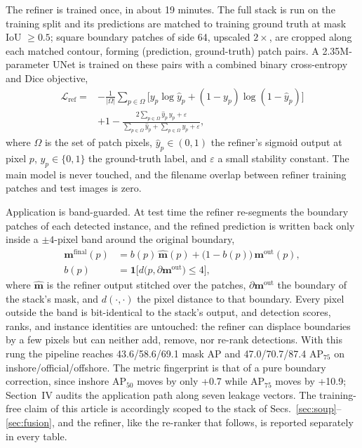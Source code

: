 The refiner is trained once, in about 19 minutes. The full stack is run on the training split and its predictions are matched to training ground truth at mask IoU $\ge 0.5$; square boundary patches of side 64, upscaled $2\times$, are cropped along each matched contour, forming (prediction, ground-truth) patch pairs. A 2.35M-parameter UNet is trained on these pairs with a combined binary cross-entropy and Dice objective,
\begin{equation}\label{eq:bprloss}
\begin{split}
\mathcal{L}_{\mathrm{ref}}
={}&-\frac{1}{|\Omega|}\sum_{p\in\Omega}\bigl[y_p\log\hat{y}_p+(1-y_p)\log(1-\hat{y}_p)\bigr]\\
&+1-\frac{2\sum_{p\in\Omega}\hat{y}_p\,y_p+\varepsilon}
{\sum_{p\in\Omega}\hat{y}_p+\sum_{p\in\Omega}y_p+\varepsilon},
\end{split}
\end{equation}
where $\Omega$ is the set of patch pixels, $\hat{y}_p\in(0,1)$ the refiner's sigmoid output at pixel $p$, $y_p\in\{0,1\}$ the ground-truth label, and $\varepsilon$ a small stability constant. The main model is never touched, and the filename overlap between refiner training patches and test images is zero.

Application is band-guarded. At test time the refiner re-segments the boundary patches of each detected instance, and the refined prediction is written back only inside a $\pm 4$-pixel band around the original boundary,
\begin{equation}\label{eq:guard}
\begin{split}
\mathbf{m}^{\mathrm{final}}(p)&=b(p)\,\hat{\mathbf{m}}(p)+\bigl(1-b(p)\bigr)\,\mathbf{m}^{\mathrm{out}}(p),\\
b(p)&=\mathbf{1}\bigl[d\bigl(p,\partial\mathbf{m}^{\mathrm{out}}\bigr)\le 4\bigr],
\end{split}
\end{equation}
where $\hat{\mathbf{m}}$ is the refiner output stitched over the patches, $\partial\mathbf{m}^{\mathrm{out}}$ the boundary of the stack's mask, and $d(\cdot,\cdot)$ the pixel distance to that boundary. Every pixel outside the band is bit-identical to the stack's output, and detection scores, ranks, and instance identities are untouched: the refiner can displace boundaries by a few pixels but can neither add, remove, nor re-rank detections. With this rung the pipeline reaches 43.6/58.6/69.1 mask AP and 47.0/70.7/87.4 AP$_{75}$ on inshore/official/offshore. The metric fingerprint is that of a pure boundary correction, since inshore AP$_{50}$ moves by only +0.7 while AP$_{75}$ moves by +10.9; Section~IV audits the application path along seven leakage vectors. The training-free claim of this article is accordingly scoped to the stack of Secs.~\ref{sec:soup}--\ref{sec:fusion}, and the refiner, like the re-ranker that follows, is reported separately in every table.

